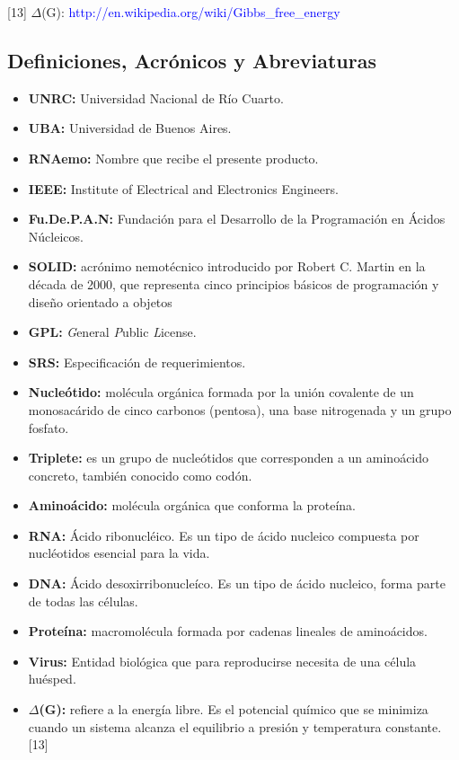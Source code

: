 \documentclass[10pt,a4paper,english,spanish]{article}
\begin{document}
[13] $\Delta$(G): \textcolor{blue}{http://en.wikipedia.org/wiki/Gibbs\_free\_energy} 

\subsection{Definiciones, Acrónicos y Abreviaturas}
\begin{itemize}
	\item \textbf{UNRC:} Universidad Nacional de Río Cuarto.
	\item \textbf{UBA:} Universidad de Buenos Aires.
	\item \textbf{RNAemo:} Nombre que recibe el presente producto.
	\item \textbf{IEEE:} Institute of Electrical and Electronics Engineers.
	\item \textbf{Fu.De.P.A.N:} Fundación para el Desarrollo de la Programación en Ácidos Núcleicos.
	\item \textbf{SOLID:} acrónimo nemotécnico introducido por Robert C. Martin en la
							década de 2000, que representa cinco principios básicos de programación
							y diseño orientado a objetos
	\item \textbf{GPL:} \textit{G}eneral \textit{P}ublic \textit{L}icense.	
	\item \textbf{SRS:} Especificación de requerimientos.
	\item \textbf{Nucleótido:} molécula orgánica formada por la unión covalente de un monosacárido de cinco carbonos 							(pentosa), una base nitrogenada y un grupo fosfato.
	\item \textbf{Triplete:} es un grupo de nucleótidos que corresponden a un aminoácido concreto, también conocido como 								codón.
	\item \textbf{Aminoácido:} molécula orgánica que conforma la proteína.
	\item \textbf{RNA:} Ácido ribonucléico. Es un tipo de ácido nucleico compuesta por nucléotidos esencial para la vida.
	\item \textbf{DNA:} Ácido desoxirribonucleíco. Es un tipo de ácido nucleico, forma parte de todas las células.
	\item \textbf{Proteína:} macromolécula formada por cadenas lineales de aminoácidos.
	\item \textbf{Virus:} Entidad biológica que para reproducirse necesita de una célula huésped.	
	\item \textbf{$\Delta$(G):} refiere a la energía libre. Es el potencial químico que se minimiza cuando un sistema 									alcanza el equilibrio a presión y temperatura constante. [13] 

\end{itemize}
\end{document}
